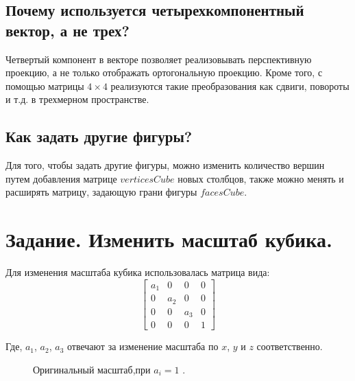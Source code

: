 \documentclass[a5paper, 10pt]{article}
\theoremstyle{definition}
\theoremstyle{plain}
\theoremstyle{remark}
\begin{document}
\newpage
\subsection{Почему используется четырехкомпонентный вектор, а не трех?}
Четвертый компонент в векторе позволяет реализовывать перспективную проекцию, а не только отображать ортогональную проекцию. Кроме того, с помощью матрицы $4 \times 4$ реализуются такие преобразования как сдвиги, повороты и т.д. в трехмерном пространстве.

\subsection{Как задать другие фигуры?}
Для того, чтобы задать другие фигуры, можно изменить количество вершин путем добавления матрице $verticesCube$ новых столбцов, также можно менять и расширять матрицу, задающую грани фигуры $facesCube$.





\newpage
\section{Задание. Изменить масштаб кубика.}
Для изменения масштаба кубика использовалась матрица вида:
\begin{equation}
\begin{bmatrix}
a_1 & 0 & 0 & 0\\
0 & a_2 & 0 & 0 \\
0 & 0 & a_3 & 0\\
0 & 0 & 0 & 1
\end{bmatrix}
\end{equation}

Где, $a_1$, $a_2$, $a_3$ отвечают за изменение масштаба по $x$, $y$ и $z$ соответственно.
\begin{figure}[h!]
\caption{Оригинальный масштаб,при $a_i = 1$ .}
\end{figure}
\end{document}
